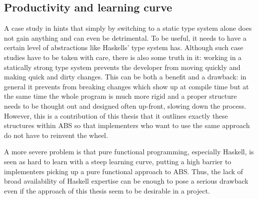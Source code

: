 
\subsection{Productivity and learning curve}
A case study in \cite{hanenberg_experiment_2010} hints that simply by switching to a static type system alone does not gain anything and can even be detrimental. To be useful, it needs to have a certain level of abstractions like Haskells' type system has. Although such case studies have to be taken with care, there is also some truth in it: working in a statically strong type system prevents the developer from moving quickly and making quick and dirty changes. This can be both a benefit and a drawback: in general it prevents from breaking changes which show up at compile time but at the same time the whole program is much more rigid and a proper structure needs to be thought out and designed often up-front, slowing down the process. However, this is a contribution of this thesis that it outlines exactly these structures within ABS so that implementers who want to use the same approach do not have to reinvent the wheel.

A more severe problem is that pure functional programming, especially Haskell, is seen as hard to learn with a steep learning curve, putting a high barrier to implementers picking up a pure functional approach to ABS. Thus, the lack of broad availability of Haskell expertise can be enough to pose a serious drawback even if the approach of this thesis seem to be desirable in a project.

